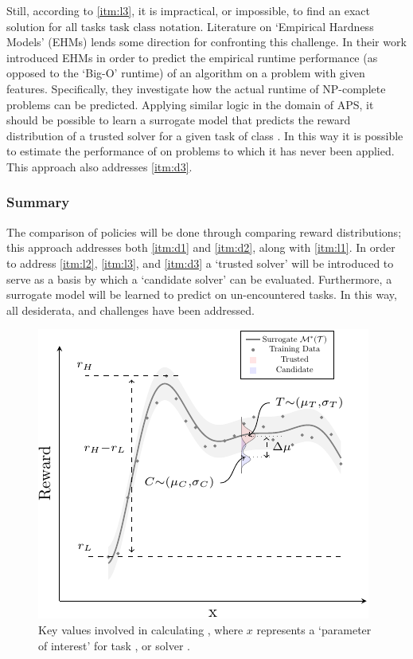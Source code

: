         Still, according to \ref{itm:l3}, it is impractical, or impossible, to find an exact solution for all tasks $\text{task class notation}$. Literature on `Empirical Hardness Models' (EHMs) lends some direction for confronting this challenge. In their work \cite{Leyton-Brown2009-yr,Hutter2009-og} introduced EHMs in order to predict the empirical runtime performance (as opposed to the `Big-O' runtime) of an algorithm on a problem with given features. Specifically, they investigate how the actual runtime of NP-complete problems can be predicted. Applying similar logic in the domain of APS, it should be possible to learn a surrogate model \surrogate{} that predicts the reward distribution \rwdstarapprox{} of a trusted solver \solvestar{} for a given task \task{} of class \taskclass. In this way it is possible to estimate the performance of \solvestar{} on problems to which it has never been applied. This approach also addresses \ref{itm:d3}.
        
    \subsubsection{Summary} The comparison of policies will be done through comparing reward distributions; this approach addresses both \ref{itm:d1} and \ref{itm:d2}, along with \ref{itm:l1}. In order to address \ref{itm:l2}, \ref{itm:l3}, and \ref{itm:d3} a `trusted solver' \solvestar{} will be introduced to serve as a basis by which a `candidate solver' \solve{} can be evaluated. Furthermore, a surrogate model \surrogate{} will be learned to predict \rwdstarapprox{} on un-encountered tasks. In this way, all desiderata, and challenges have been addressed.
        
   \begin{figure}[tb]
        \centering
        \includegraphics[width=0.75\linewidth]{Figures/sq_v2_fig-crop}
        \caption{Key values involved in calculating \xQ, where $x$ represents a `parameter of interest' for task \task, or solver \solve.}
        \label{fig:sq_v2}
        \vspace{-0.2cm}
    \end{figure}
